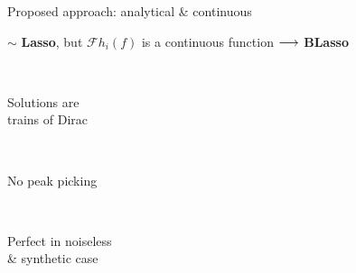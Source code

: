 \begin{frame}{Proposed approach: analytical \& continuous \hfill\faJediOrder}
        \vfill
        \begin{center}
            \small
            $\sim$ \textbf{Lasso}, but $\mathcal{F}h_i (f)$ is a continuous function $\longrightarrow$ \textbf{BLasso}~\cite{azais2015spike}

            \textcolor{mygreen}{ \quad
            \cmark \, \parbox{8.5em}{Solutions are\\trains of Dirac} \quad
            \cmark \, \parbox{8em}{No peak picking} \quad
            \cmark \, \parbox{9em}{Perfect in noiseless\\\& synthetic case}
            }
        \end{center}


\end{frame}


